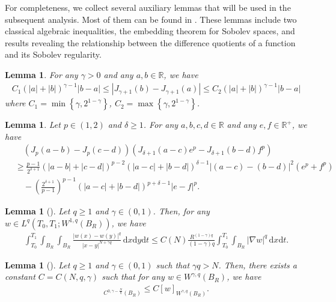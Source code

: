 \documentclass[reqno,10pt]{amsart}
\numberwithin{equation}{section}
\newtheorem{lemma}[theorem]{Lemma}
\begin{document}
For completeness, we collect several auxiliary lemmas that will be used in the subsequent analysis. Most of them can be found in \cite[Section 2]{LZ25,LZ2501}. These lemmas include two classical algebraic inequalities, the embedding theorem for Sobolev spaces, and results revealing the relationship between the difference quotients of a function and its Sobolev regularity.

\begin{lemma}
	\label{lem9}
	For any $\gamma>0$ and any $a,b\in \mathbb{R}$, we have
	\begin{align*}
		C_1\left( |a|+|b|\right) ^{\gamma-1}|b-a|\le \left| J_{\gamma+1}(b)-J_{\gamma+1}(a)\right| \le C_2\left( |a|+|b|\right) ^{\gamma-1}|b-a|
	\end{align*}
	where $C_1=\min\left\lbrace \gamma,2^{1-\gamma}\right\rbrace $, $C_2=\max\left\lbrace \gamma,2^{1-\gamma}\right\rbrace $.
\end{lemma}

\begin{lemma}
	\label{lem16}
	Let $p\in(1,2)$ and $\delta\ge1$. For any $a, b, c, d\in\mathbb{R}$ and any $e, f\in \mathbb{R}^+$, we have
	\begin{align*}
		&\quad\left( J_p(a-b)-J_p(c-d)\right)\left( J_{\delta+1}(a-c)e^p-J_{\delta+1}(b-d)f^p\right)\\
		&\ge \frac{p-1}{2^{\delta+1}}\left( |a-b|+|c-d|\right)^{p-2}\left( |a-c|+|b-d|\right)^{\delta-1}\left| (a-c)-(b-d)\right|^2\left( e^p+f^p\right)\\
		&\quad -\left( \frac{2^{\delta+1}}{p-1}\right)^{p-1}\left( |a-c|+|b-d|\right)^{p+\delta-1}|e-f|^p . 
	\end{align*}
\end{lemma}

\begin{lemma}[]
	\label{lem14.1}
	Let $q\ge1$ and $\gamma\in(0,1)$. Then, for any $w\in L^q\left( T_0,T_1;W^{1,q}(B_R)\right) $, we have
	\begin{align*}
		\int_{T_0}^{T_1}\int_{B_R}\int_{B_R}\frac{|w(x)-w(y)|^q}{|x-y|^{N+\gamma q}}\,\mathrm{d}x\mathrm{d}y\mathrm{d}t\le C(N)\frac{R^{(1-\gamma)q}}{(1-\gamma)q}\int_{T_0}^{T_1}\int_{B_R}|\nabla w|^q\,\mathrm{d}x\mathrm{d}t.
	\end{align*}
\end{lemma}

\begin{lemma}[]
	\label{lem23}
	Let $q\ge1$ and $\gamma\in (0,1)$ such that $\gamma q >N$. Then, there exists a constant $C=C(N, q, \gamma)$ such that for any $w\in W^{\gamma,q}(B_R)$, we have
	\begin{align*}
		[w]_{C^{0,\gamma-\frac{N}{q}}(B_R)}\le C[w]_{W^{\gamma, q}(B_R)}.
	\end{align*}
\end{lemma}
\end{document}
